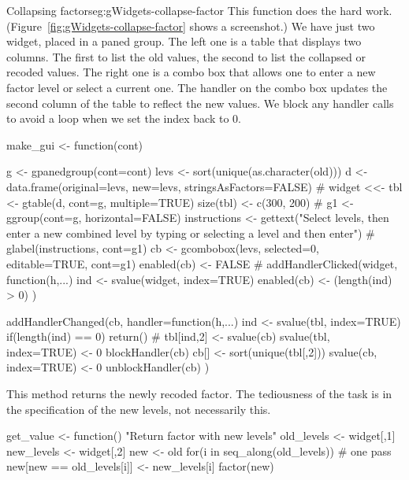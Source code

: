 \begin{example}{Collapsing factors}{eg:gWidgets-collapse-factor}
This  function does the hard
work. (Figure~\ref{fig:gWidgets-collapse-factor} shows a screenshot.)
We have just two widget, placed in a paned group. The left one is a
table that displays two columns. The first to list the old values, the
second to list the collapsed or recoded values. The right one is a
combo box that allows one to enter a new factor level or select a
current one. The handler on the combo box updates the second column of
the table to reflect the new values. We block any handler calls to
avoid a loop when we set the index back to 0.
\begin{Schunk}
\begin{Sinput}
 make_gui <- function(cont) {
   g <- gpanedgroup(cont=cont)
   levs <- sort(unique(as.character(old)))
   d <- data.frame(original=levs,
                   new=levs, stringsAsFactors=FALSE)
   #
   widget <<- tbl <- gtable(d, cont=g,  multiple=TRUE)
   size(tbl) <- c(300, 200)
   #
   g1 <- ggroup(cont=g, horizontal=FALSE)
   instructions <- gettext("Select levels, then\n 
 enter a new combined level\n
 by typing or selecting a level and then enter")
   #
   glabel(instructions, cont=g1)
   cb <- gcombobox(levs, selected=0, editable=TRUE, cont=g1)
   enabled(cb) <- FALSE
   #
   addHandlerClicked(widget, function(h,...) {
     ind <- svalue(widget, index=TRUE)
     enabled(cb) <- (length(ind) > 0)
   })
   
   addHandlerChanged(cb, handler=function(h,...) {
     ind <- svalue(tbl, index=TRUE)
     if(length(ind) == 0) 
       return()
     #
     tbl[ind,2] <- svalue(cb)
     svalue(tbl, index=TRUE) <- 0
     blockHandler(cb)
     cb[] <- sort(unique(tbl[,2]))
     svalue(cb, index=TRUE) <- 0
     unblockHandler(cb)
   })
 }
\end{Sinput}
\end{Schunk}

This method returns the newly recoded factor. The tediousness of the task
is in the specification of the new levels, not necessarily this. 
\begin{Schunk}
\begin{Sinput}
 get_value <- function() {
   "Return factor with new levels"
   old_levels <- widget[,1]
   new_levels <- widget[,2]
   new <- old
   for(i in seq_along(old_levels)) # one pass
     new[new == old_levels[i]] <- new_levels[i]
   factor(new)
 }
\end{Sinput}
\end{Schunk}
%


\end{example}
